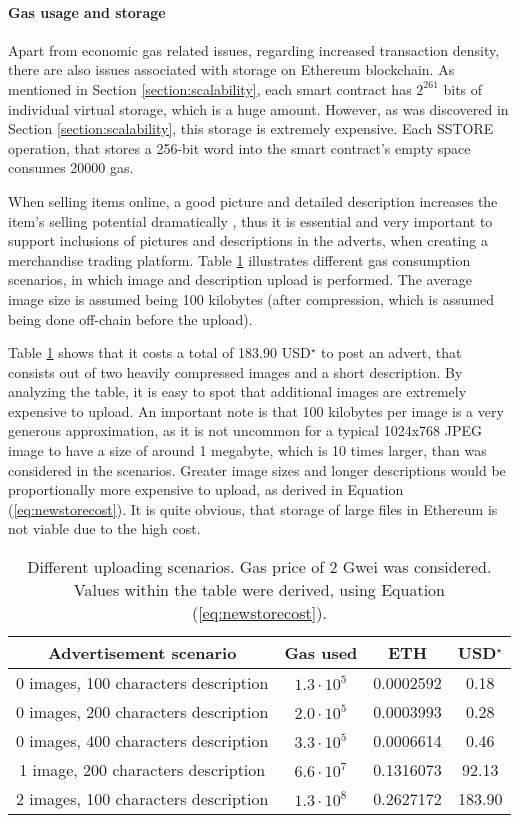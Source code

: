 \paragraph{Gas usage and storage}
Apart from economic gas related issues, regarding increased transaction density, there are also issues associated with storage on Ethereum blockchain. As mentioned in Section \ref{section:scalability}, each smart contract has $2^{261}$ bits of individual virtual storage, which is a huge amount. However, as was discovered in Section \ref{section:scalability}, this storage is extremely expensive. Each {\small SSTORE} operation, that stores a 256-bit word into the smart contract's empty space consumes 20000 gas.

When selling items online, a good picture and detailed description increases the item's selling potential dramatically \citep{ebay}, thus it is essential and very important to support inclusions of pictures and descriptions in the adverts, when creating a merchandise trading platform. Table \ref{tab:imgdescscenarios} illustrates different gas consumption scenarios, in which image and description upload is performed. The average image size is assumed being 100 kilobytes (after compression, which is assumed being done off-chain before the upload). 

Table \ref{tab:imgdescscenarios} shows that it costs a total of 183.90 USD$^\star$ to post an advert, that consists out of two heavily compressed images and a short description. By analyzing the table, it is easy to spot that additional images are extremely expensive to upload. An important note is that 100 kilobytes per image is a very generous approximation, as it is not uncommon for a typical 1024x768 JPEG image to have a size of around 1 megabyte, which is 10 times larger, than was considered in the scenarios. Greater image sizes and longer descriptions would be proportionally more expensive to upload, as derived in Equation (\ref{eq:newstorecost}). It is quite obvious, that storage of large files in Ethereum is not viable due to the high cost.

\begin{table}[H]
\centering
\begin{tabular}{| c | c | c | c |}
\hline
\textbf{Advertisement scenario}& \textbf{Gas used} & \textbf{ETH} & \textbf{USD$^\star$}\\
\hline 
0 images, 100 characters description & $1.3 \cdot 10^5$ & 0.0002592 & 0.18\\
0 images, 200 characters description & $2.0 \cdot 10^5$ & 0.0003993 & 0.28\\
0 images, 400 characters description & $3.3 \cdot 10^5$ & 0.0006614 & 0.46\\
1 image, 200 characters description & $6.6 \cdot 10^7$ & 0.1316073 & 92.13\\
2 images, 100 characters description & $1.3 \cdot 10^8$ & 0.2627172 & 183.90\\
\hline
\end{tabular}
\caption{Different uploading scenarios. Gas price of 2 Gwei was considered. Values within the table were derived, using Equation \textnormal{(\ref{eq:newstorecost})}.}
\label{tab:imgdescscenarios}
\end{table}

